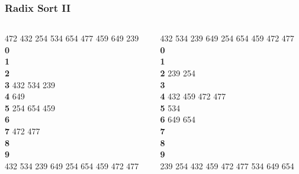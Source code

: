 \begin{frame}[fragile]
\frametitle{Radix Sort II}
\begin{columns}[T]

\begin{column}{0.45\textwidth}
472 432 254 534 654 477 459 649 239\\
\vspace*{1em}
{\bf 0}\\
{\bf 1}\\
{\bf 2}\\
{\bf 3} 432 534 239\\
{\bf 4} 649\\
{\bf 5} 254 654 459\\
{\bf 6}\\
{\bf 7} 472 477\\
{\bf 8}\\
{\bf 9}\\
\vspace*{1em}
432 534 239 649 254 654 459 472 477
\end{column}

\pause
\begin{column}{0.45\textwidth}
432 534 239 649 254 654 459 472 477\\
\vspace*{1em}
{\bf 0}\\
{\bf 1}\\
{\bf 2} 239 254\\
{\bf 3}\\
{\bf 4} 432 459 472 477\\
{\bf 5} 534\\
{\bf 6} 649 654\\
{\bf 7}\\
{\bf 8}\\
{\bf 9}\\
\vspace*{1em}
239 254 432 459 472 477 534 649 654
\end{column}

\end{columns}
\end{frame}


